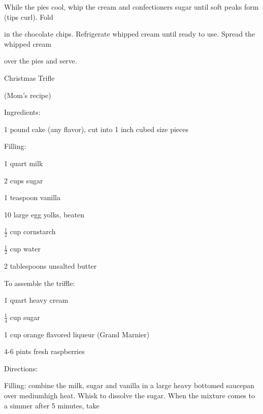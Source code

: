 \documentclass[a4paper,portrait,12pt]{book}
\begin{document}
While the pies cool, whip the cream and confectioners sugar until soft peaks form (tips curl). Fold




in the chocolate chips. Refrigerate whipped cream until ready to use. Spread the whipped cream




over the pies and serve.







\newpage
Christmas Trifle




(Mom's recipe)




Ingredients:




1 pound cake (any flavor), cut into 1 inch cubed size pieces




Filling:




1 quart milk




2 cups sugar




1 teaspoon vanilla




10 large egg yolks, beaten




$\frac{1}{2}$ cup cornstarch




$\frac{1}{2}$ cup water




2 tablespoons unsalted butter




To assemble the triffle:




1 quart heavy cream




$\frac{1}{4}$ cup sugar




1 cup orange flavored liqueur (Grand Marnier)




4-6 pints fresh raspberries




Directions:




Filling: combine the milk, sugar and vanilla in a large heavy bottomed saucepan over mediumhigh heat. Whisk to dissolve the sugar. When the mixture comes to a simmer after 5 minutes, take
\end{document}
